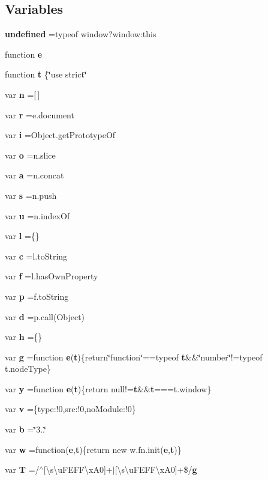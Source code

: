 \subsection*{Variables}
\begin{DoxyCompactItemize}
\item 
{\bf undefined} =typeof window?window\+:this
\item 
function {\bf e}
\item 
function {\bf t} \{\char`\"{}use strict\char`\"{}
\item 
var {\bf n} =[$\,$]
\item 
var {\bf r} =e.\+document
\item 
var {\bf i} =Object.\+get\+Prototype\+Of
\item 
var {\bf o} =n.\+slice
\item 
var {\bf a} =n.\+concat
\item 
var {\bf s} =n.\+push
\item 
var {\bf u} =n.\+index\+Of
\item 
var {\bf l} =\{\}
\item 
var {\bf c} =l.\+to\+String
\item 
var {\bf f} =l.\+has\+Own\+Property
\item 
var {\bf p} =f.\+to\+String
\item 
var {\bf d} =p.\+call(Object)
\item 
var {\bf h} =\{\}
\item 
var {\bf g} =function {\bf e}({\bf t})\{return\char`\"{}function\char`\"{}==typeof {\bf t}\&\&\char`\"{}number\char`\"{}!=typeof t.\+node\+Type\}
\item 
var {\bf y} =function {\bf e}({\bf t})\{return null!={\bf t}\&\&{\bf t}===t.\+window\}
\item 
var {\bf v} =\{type\+:!0,src\+:!0,no\+Module\+:!0\}
\item 
var {\bf b} =\char`\"{}3..\char`\"{}
\item 
var {\bf w} =function({\bf e},{\bf t})\{return new w.\+fn.\+init({\bf e},{\bf t})\}
\item 
var {\bf T} =/$^\wedge$[\textbackslash{}s\textbackslash{}u\+F\+E\+F\+F\textbackslash{}x\+A0]+$\vert$[\textbackslash{}s\textbackslash{}u\+F\+E\+F\+F\textbackslash{}x\+A0]+\$/{\bf g}
\item 

\end{DoxyCompactItemize}
